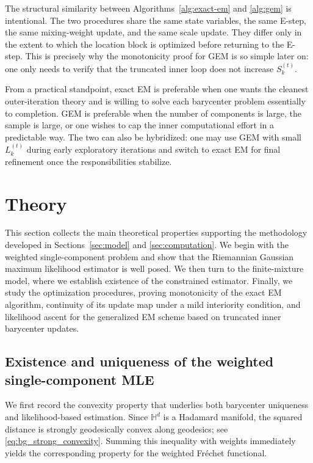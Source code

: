 \documentclass[11pt]{article}
\begin{document}
The structural similarity between Algorithms~\ref{alg:exact-em} and \ref{alg:gem} is intentional. The two procedures share the same state variables, the same E-step, the same mixing-weight update, and the same scale update. They differ only in the extent to which the location block is optimized before returning to the E-step. This is precisely why the monotonicity proof for GEM is so simple later on: one only needs to verify that the truncated inner loop does not increase \(S_k^{(t)}\).

From a practical standpoint, exact EM is preferable when one wants the cleanest outer-iteration theory and is willing to solve each barycenter problem essentially to completion. GEM is preferable when the number of components is large, the sample is large, or one wishes to cap the inner computational effort in a predictable way. The two can also be hybridized: one may use GEM with small \(L_k^{(t)}\) during early exploratory iterations and switch to exact EM for final refinement once the responsibilities stabilize.





\section{Theory}\label{sec:theory}

This section collects the main theoretical properties supporting the methodology developed in Sections~\ref{sec:model} and \ref{sec:computation}. We begin with the weighted single-component problem and show that the Riemannian Gaussian maximum likelihood estimator is well posed. We then turn to the finite-mixture model, where we establish existence of the constrained estimator. Finally, we study the optimization procedures, proving monotonicity of the exact EM algorithm, continuity of its update map under a mild interiority condition, and likelihood ascent for the generalized EM scheme based on truncated inner barycenter updates.

\subsection{Existence and uniqueness of the weighted single-component MLE}\label{subsec:single-mle-theory}

We first record the convexity property that underlies both barycenter uniqueness and likelihood-based estimation. Since \(\mathbb{H}^d\) is a Hadamard manifold, the squared distance is strongly geodesically convex along geodesics; see \eqref{eq:bg_strong_convexity}. Summing this inequality with weights immediately yields the corresponding property for the weighted Fr\'echet functional.
\end{document}
